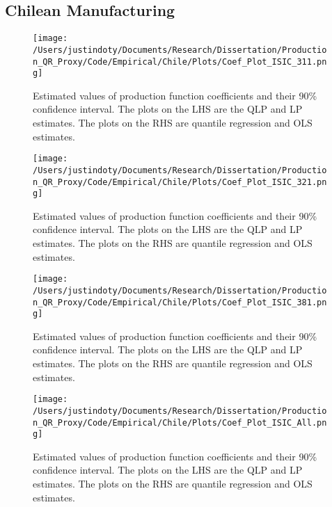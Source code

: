 \documentclass[11pt]{article}
\begin{document}
\subsection{Chilean Manufacturing}




\begin{figure}[H]
\centering
\texttt{[image: /Users/justindoty/Documents/Research/Dissertation/Production\_QR\_Proxy/Code/Empirical/Chile/Plots/Coef\_Plot\_ISIC\_311.png]}
\caption{Estimated values of production function coefficients and their 90\% confidence interval. The plots on the LHS are the QLP and LP estimates. The plots on the RHS are quantile regression and OLS estimates.}
\end{figure}

\begin{figure}[H]
\centering
\texttt{[image: /Users/justindoty/Documents/Research/Dissertation/Production\_QR\_Proxy/Code/Empirical/Chile/Plots/Coef\_Plot\_ISIC\_321.png]}
\caption{Estimated values of production function coefficients and their 90\% confidence interval. The plots on the LHS are the QLP and LP estimates. The plots on the RHS are quantile regression and OLS estimates.}
\end{figure}

\begin{figure}[H]
\centering
\texttt{[image: /Users/justindoty/Documents/Research/Dissertation/Production\_QR\_Proxy/Code/Empirical/Chile/Plots/Coef\_Plot\_ISIC\_381.png]}
\caption{Estimated values of production function coefficients and their 90\% confidence interval. The plots on the LHS are the QLP and LP estimates. The plots on the RHS are quantile regression and OLS estimates.}
\end{figure}

\begin{figure}[H]
\centering
\texttt{[image: /Users/justindoty/Documents/Research/Dissertation/Production\_QR\_Proxy/Code/Empirical/Chile/Plots/Coef\_Plot\_ISIC\_All.png]}
\caption{Estimated values of production function coefficients and their 90\% confidence interval. The plots on the LHS are the QLP and LP estimates. The plots on the RHS are quantile regression and OLS estimates.}
\end{figure}
\end{document}
